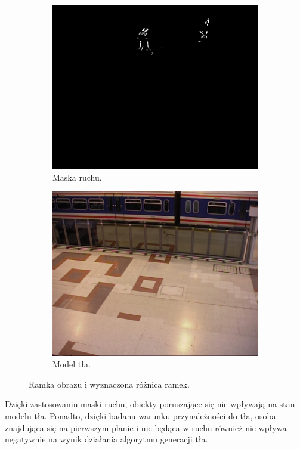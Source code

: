 \begin{figure}[H]
	\begin{subfigure}[b]{0.49\textwidth}
		\includegraphics[width=\textwidth]{img/bg-mo.png}
		\caption{Maska ruchu.}
	\end{subfigure}
	\hfill
	\begin{subfigure}[b]{0.49\textwidth}
		\includegraphics[width=\textwidth]{img/bg-model.png}
		\caption{Model tła.}
	\end{subfigure}
	\caption{Ramka obrazu i wyznaczona różnica ramek.}
	\label{fig:background-model-result}
\end{figure}

Dzięki zastosowaniu maski ruchu, obiekty poruszające się nie wpływają na stan modelu tła. Ponadto, dzięki badanu warunku przynależności do tła, osoba znajdująca się na pierwszym planie i nie będąca w ruchu również nie wpływa negatywnie na wynik działania algorytmu generacji tła.


